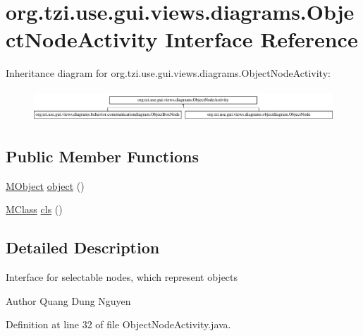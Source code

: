 \hypertarget{interfaceorg_1_1tzi_1_1use_1_1gui_1_1views_1_1diagrams_1_1_object_node_activity}{\section{org.\-tzi.\-use.\-gui.\-views.\-diagrams.\-Object\-Node\-Activity Interface Reference}
\label{interfaceorg_1_1tzi_1_1use_1_1gui_1_1views_1_1diagrams_1_1_object_node_activity}
}
Inheritance diagram for org.\-tzi.\-use.\-gui.\-views.\-diagrams.\-Object\-Node\-Activity\-:\begin{figure}[H]
\begin{center}
\leavevmode
\includegraphics[height=1.194030cm]{interfaceorg_1_1tzi_1_1use_1_1gui_1_1views_1_1diagrams_1_1_object_node_activity}
\end{center}
\end{figure}
\subsection*{Public Member Functions}
\begin{DoxyCompactItemize}
\item 
\hyperlink{interfaceorg_1_1tzi_1_1use_1_1uml_1_1sys_1_1_m_object}{M\-Object} \hyperlink{interfaceorg_1_1tzi_1_1use_1_1gui_1_1views_1_1diagrams_1_1_object_node_activity_ada6d970678b2b25aa808a3f20f8c2550}{object} ()
\item 
\hyperlink{interfaceorg_1_1tzi_1_1use_1_1uml_1_1mm_1_1_m_class}{M\-Class} \hyperlink{interfaceorg_1_1tzi_1_1use_1_1gui_1_1views_1_1diagrams_1_1_object_node_activity_a1df8042bec91b0444c256804893a093d}{cls} ()
\end{DoxyCompactItemize}


\subsection{Detailed Description}
Interface for selectable nodes, which represent objects \begin{DoxyAuthor}{Author}
Quang Dung Nguyen 
\end{DoxyAuthor}


Definition at line 32 of file Object\-Node\-Activity.\-java.



